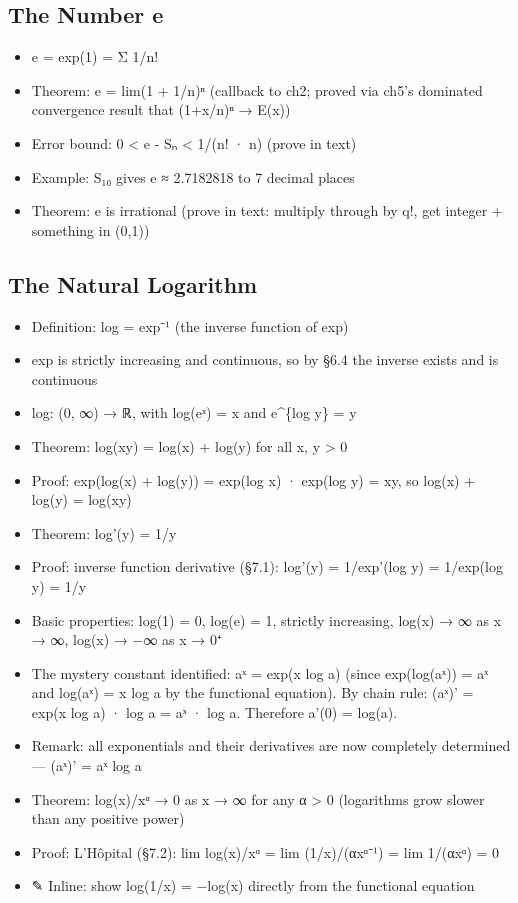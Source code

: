 \documentclass[
  10pt,
  letterpaper,
]{scrbook}
\providecommand{\tightlist}{%
  \setlength{\itemsep}{0pt}\setlength{\parskip}{0pt}}
\begin{document}
\subsection{The Number e}\label{the-number-e-2}

\begin{itemize}
\tightlist
\item
  e = exp(1) = Σ 1/n!
\item
  Theorem: e = lim(1 + 1/n)ⁿ (callback to ch2; proved via ch5's
  dominated convergence result that (1+x/n)ⁿ → E(x))
\item
  Error bound: 0 \textless{} e - Sₙ \textless{} 1/(n! · n) (prove in
  text)
\item
  Example: S₁₀ gives e ≈ 2.7182818 to 7 decimal places
\item
  Theorem: e is irrational (prove in text: multiply through by q!, get
  integer + something in (0,1))
\end{itemize}

\subsection{The Natural Logarithm}\label{the-natural-logarithm}

\begin{itemize}
\tightlist
\item
  Definition: log = exp⁻¹ (the inverse function of exp)
\item
  exp is strictly increasing and continuous, so by §6.4 the inverse
  exists and is continuous
\item
  log: (0, ∞) → ℝ, with log(eˣ) = x and e\^{}\{log y\} = y
\item
  Theorem: log(xy) = log(x) + log(y) for all x, y \textgreater{} 0
\item
  Proof: exp(log(x) + log(y)) = exp(log x) · exp(log y) = xy, so log(x)
  + log(y) = log(xy)
\item
  Theorem: log'(y) = 1/y
\item
  Proof: inverse function derivative (§7.1): log'(y) = 1/exp'(log y) =
  1/exp(log y) = 1/y
\item
  Basic properties: log(1) = 0, log(e) = 1, strictly increasing, log(x)
  → ∞ as x → ∞, log(x) → −∞ as x → 0⁺
\item
  The mystery constant identified: aˣ = exp(x log a) (since exp(log(aˣ))
  = aˣ and log(aˣ) = x log a by the functional equation). By chain rule:
  (aˣ)' = exp(x log a) · log a = aˣ · log a. Therefore a'(0) = log(a).
\item
  Remark: all exponentials and their derivatives are now completely
  determined --- (aˣ)' = aˣ log a
\item
  Theorem: log(x)/xᵅ → 0 as x → ∞ for any α \textgreater{} 0 (logarithms
  grow slower than any positive power)
\item
  Proof: L'Hôpital (§7.2): lim log(x)/xᵅ = lim (1/x)/(αxᵅ⁻¹) = lim
  1/(αxᵅ) = 0
\item
  ✎ Inline: show log(1/x) = −log(x) directly from the functional
  equation
\end{itemize}
\end{document}
